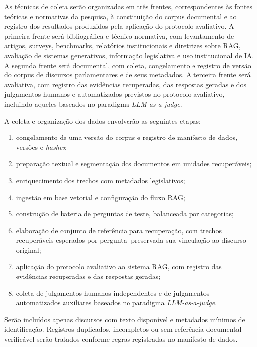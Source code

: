 As técnicas de coleta serão organizadas em três frentes, correspondentes às fontes teóricas e normativas da pesquisa, à constituição do corpus documental e ao registro dos resultados produzidos pela aplicação do protocolo avaliativo. A primeira frente será bibliográfica e técnico-normativa, com levantamento de artigos, surveys, benchmarks, relatórios institucionais e diretrizes sobre RAG, avaliação de sistemas generativos, informação legislativa e uso institucional de IA. A segunda frente será documental, com coleta, congelamento e registro de versão do corpus de discursos parlamentares e de seus metadados. A terceira frente será avaliativa, com registro das evidências recuperadas, das respostas geradas e dos julgamentos humanos e automatizados previstos no protocolo avaliativo, incluindo aqueles baseados no paradigma \textit{LLM-as-a-judge}.

A coleta e organização dos dados envolverão as seguintes etapas:

\begin{enumerate}
  \item congelamento de uma versão do corpus e registro de manifesto de dados, versões e \textit{hashes};
  \item preparação textual e segmentação dos documentos em unidades recuperáveis;
  \item enriquecimento dos trechos com metadados legislativos;
  \item ingestão em base vetorial e configuração do fluxo RAG;
  \item construção de bateria de perguntas de teste, balanceada por categorias;
  \item elaboração de conjunto de referência para recuperação, com trechos recuperáveis esperados por pergunta, preservada sua vinculação ao discurso original;
  \item aplicação do protocolo avaliativo ao sistema RAG, com registro das evidências recuperadas e das respostas geradas;
  \item coleta de julgamentos humanos independentes e de julgamentos automatizados auxiliares baseados no paradigma \textit{LLM-as-a-judge}.
\end{enumerate}

Serão incluídos apenas discursos com texto disponível e metadados mínimos de identificação. Registros duplicados, incompletos ou sem referência documental verificável serão tratados conforme regras registradas no manifesto de dados.

